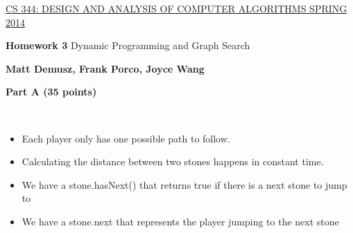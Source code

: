 \documentclass{article}
\begin{document}
\sloppy

\noindent \underline{CS 344: DESIGN AND ANALYSIS OF COMPUTER
  ALGORITHMS \hspace{1.6in} SPRING 2014}

\vspace{0.1in}

\begin{center}
{\bf {\large Homework 3}}
Dynamic Programming and Graph Search
\end{center}

\begin{center}
{\bf Matt Demusz, Frank Porco, Joyce Wang}
\end{center}

\begin{center}
{\bf Part A (35 points)}
\end{center}

 \\

\begin{itemize}
\item Each player only has one possible path to follow.
\item Calculating the distance between two stones happens in constant time.
\item We have a stone.hasNext() that returns true if there is a next stone to jump to
\item We have a stone.next that represents the player jumping to the next stone 
\end{itemize}
\end{document}
